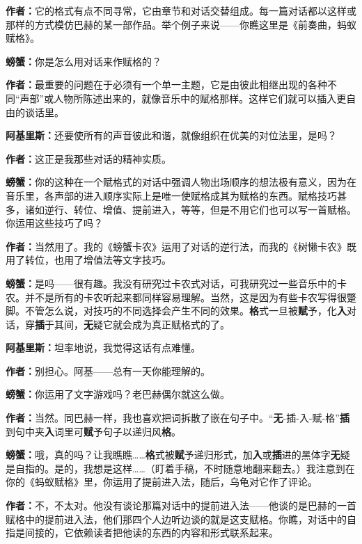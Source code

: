 \documentclass[
  12pt,
  twoside,
  openright,
  oldfontcommands,
]{memoir}
\newcommand{\kaitismall}[1]{{\kaitifamily\small #1}}
\newcommand{\heititext}[1]{{\sffamily\bfseries #1}}
\newcommand{\dialogname}[1]{{\sffamily\bfseries #1}}
\begin{document}
\dialogname{作者：}它的格式有点不同寻常，它由章节和对话交替组成。每一篇对话都以这样或那样的方式模仿巴赫的某一部作品。举个例子来说------你瞧这里是《前奏曲，蚂蚁赋格》。

\dialogname{螃蟹：}你是怎么用对话来作赋格的？

\dialogname{作者：}最重要的问题在于必须有一个单一主题，它是由彼此相继出现的各种不同``声部''或人物所陈述出来的，就像音乐中的赋格那样。这样它们就可以插入更自由的谈话里。

\dialogname{阿基里斯：}还要使所有的声音彼此和谐，就像组织在优美的对位法里，是吗？

\dialogname{作者：}这正是我那些对话的精神实质。

\dialogname{螃蟹：}你的这种在一个赋格式的对话中强调人物出场顺序的想法极有意义，因为在音乐里，各声部的进入顺序实际上是唯一使赋格成其为赋格的东西。赋格技巧甚多，诸如逆行、转位、增值、提前进入，等等，但是不用它们也可以写一首赋格。你运用这些技巧了吗？

\dialogname{作者：}当然用了。我的《螃蟹卡农》运用了对话的逆行法，而我的《树懒卡农》既用了转位，也用了增值法等文字技巧。

\dialogname{螃蟹：}是吗------很有趣。我没有研究过卡农式对话，可我研究过一些音乐中的卡农。并不是所有的卡农听起来都同样容易理解。当然，这是因为有些卡农写得很蹩脚。不管怎么说，对技巧的不同选择会产生不同的效果。\heititext{格}式一旦被\heititext{赋}予，化\heititext{入}对话，穿\heititext{插}于其间，\heititext{无}疑它就会成为真正赋格式的了。

\dialogname{阿基里斯：}坦率地说，我觉得这话有点难懂。

\dialogname{作者：}别担心。阿基------总有一天你能理解的。

\dialogname{螃蟹：}你运用了文字游戏吗？老巴赫偶尔就这么做。

\dialogname{作者：}当然。同巴赫一样，我也喜欢把词拆散了嵌在句子中。``\heititext{无}-插-入-赋-格''\heititext{插}到句中夹\heititext{入}词里可\heititext{赋}予句子以递归风\heititext{格}。

\dialogname{螃蟹：}哦，真的吗？让我瞧瞧\ldots\ldots{}\heititext{格}式被\heititext{赋}予递归形式，加\heititext{入}或\heititext{插}进的黑体字\heititext{无}疑是自指的。是的，我想是这样\ldots\ldots{}\kaitismall{（盯着手稿，不时随意地翻来翻去。）}我注意到在你的《蚂蚁赋格》里，你运用了提前进入法，随后，乌龟对它作了评论。

\dialogname{作者：}不，不太对。他没有谈论那篇对话中的提前进入法------他谈的是巴赫的一首赋格中的提前进入法，他们那四个人边听边谈的就是这支赋格。你瞧，对话中的自指是间接的，它依赖读者把他读的东西的内容和形式联系起来。
\end{document}
